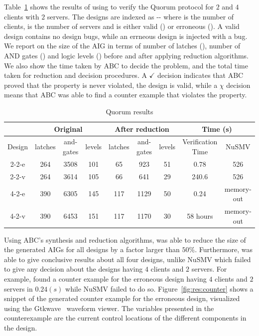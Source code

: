 Table~\ref{tb:bip:qrm} shows the results of using \biptool{} to verify the 
Quorum protocol for $2$ and $4$ clients with $2$ servers. The designs
are indexed as -- where 
 is the number of clients,  is the number of 
servers and  is either valid () or erroneous ().
A valid design contains no design bugs, while an errneous design is injected
with a bug. We report on the size of the AIG in terms of number of latches (),
number of AND gates () and logic levels () before and after
applying reduction algorithms. We also show the time taken by ABC to decide the problem, 
and the total time taken for reduction and decision procedures. 
A $\checkmark$ decision indicates that ABC proved that the property is never 
violated, \ie{} the design is valid, while a $\chi$ decision means that 
ABC was able to find a counter example that violates the property. 

\begin{table}[bt]
\caption{Quorum results}
\centering
\begin{tabular}{|c|c|c|c||c|c|c||c|c|}
\cline{2-9}
\multicolumn{1}{c|}{} & \multicolumn{ 3}{c||}{Original} & \multicolumn{3}{c||}{After reduction} & \multicolumn{ 2}{c|}{Time (s)} \\ \hline
Design & latches & and-gates & levels & latches & and-gates & levels & Verification Time & NuSMV \\ \hline
2-2-e & 264 & 3508 & 101 & 65 & 923 & 51 & 0.78 & 526 \\ \hline
2-2-v & 264 & 3614 & 105 & 66 & 641 & 29 & 240.6 & 526 \\ \hline
4-2-e & 390 & 6305 & 145 & 117 & 1129 & 50 & 0.24  & memory-out \\ \hline
4-2-v & 390 & 6453 & 151 & 117 & 1170 & 30 & 58 hours & memory-out \\ \hline
\end{tabular}
\label{tb:bip:qrm}
\end{table}

Using ABC's synthesis and reduction algorithms, \biptool{} was able to
reduce the size of the generated AIGs for all designs by a factor larger
than $50\%$. Furthermore,
\biptool{} was able to give conclusive results about all four designs, unlike
NuSMV which failed to give any decision about the designs having
$4$ clients and $2$ servers. For example, \biptool{} found a counter example for the erroneous 
design having $4$ clients and $2$ servers in $0.24 (s)$ while NuSMV failed to do
so. Figure~\ref{fig:res:counter} shows a snippet of the generated counter example for the 
erroneous design, visualized using the Gtkwave~\cite{bybell2010gtkwave} waveform viewer. 
The variables presented in the counterexample are the current control locations of
the different components in the design. 

